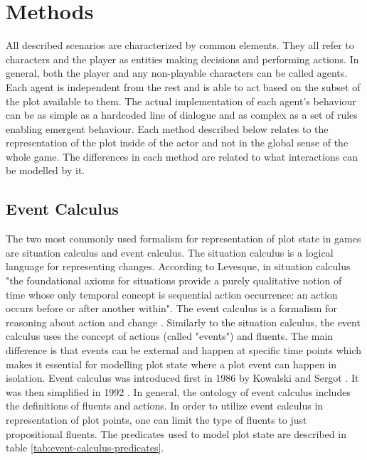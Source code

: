 
\section{Methods}

All described scenarios are characterized by common elements.
They all refer to characters and the player as entities making decisions and performing actions.
In general, both the player and any non-playable characters can be called agents.
Each agent is independent from the rest and is able to act based on the subset of the plot available to them.
The actual implementation of each agent's behaviour can be as simple as a hardcoded line of dialogue and as complex as a set of rules enabling emergent behaviour.
Each method described below relates to the representation of the plot inside of the actor and not in the global sense of the whole game.
The differences in each method are related to what interactions can be modelled by it.

\subsection{Event Calculus}

The two most commonly used formalism for representation of plot state in games are situation calculus and event calculus.
The situation calculus is a logical language for representing changes\cite{lin2008situation}.
According to Levesque, in situation calculus "the foundational axioms for situations provide a purely qualitative notion of time whose only temporal concept is sequential action occurrence: an action occurs before or after another within"\cite{levesque1998foundations}.
The event calculus is a formalism for reasoning about action and change \cite{mueller2008event}.
Similarly to the situation calculus, the event calculus uses the concept of actions (called "events") and fluents.
The main difference is that events can be external and happen at specific time points which makes it essential for modelling plot state where a plot event can happen in isolation.
Event calculus was introduced first in 1986 by Kowalski and Sergot \cite{kowalski1986logic}.
It was then simplified in 1992 \cite{kakas1992abductive}.
In general, the ontology of event calculus includes the definitions of fluents and actions.
In order to utilize event calculus in representation of plot points, one can limit the type of fluents to just propositional fluents.
The predicates used to model plot state are described in table \ref{tab:event-calculus-predicates}.

